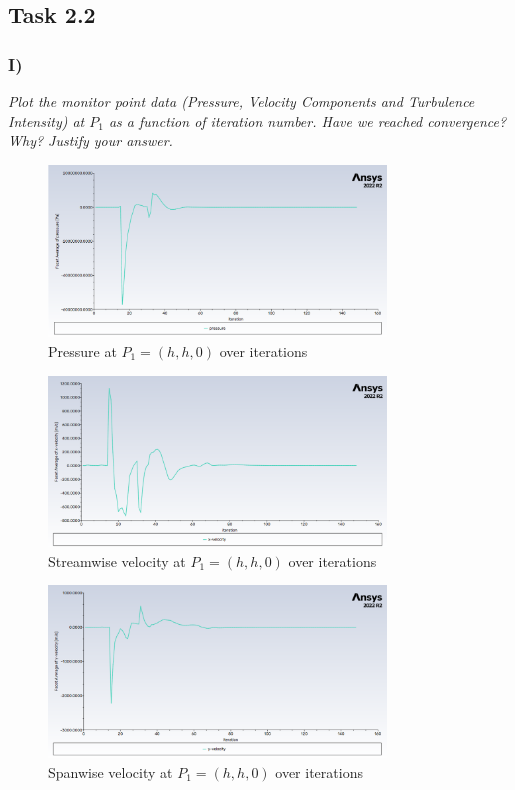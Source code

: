 \subsection{Task 2.2}
\subsubsection{I)}
\textit{Plot the monitor point data (Pressure, Velocity Components and Turbulence Intensity) at $P_1$ as a function of iteration number. Have we reached convergence? Why? Justify your answer.}
\begin{figure}[H]
    \centering
    \includegraphics[width=0.8\textwidth]{Questions/Figures/Pressure at point.png}
    \caption{Pressure at $P_1 = (h, h, 0)$ over iterations}
\end{figure}
\begin{figure}[H]
    \centering
    \includegraphics[width=0.8\textwidth]{Questions/Figures/x velocity at point.png}
    \caption{Streamwise velocity at $P_1 = (h, h, 0)$ over iterations}
\end{figure}
\begin{figure}[H]
    \centering
    \includegraphics[width=0.8\textwidth]{Questions/Figures/y velocity at point.png}
    \caption{Spanwise velocity at $P_1 = (h, h, 0)$ over iterations}
\end{figure}
